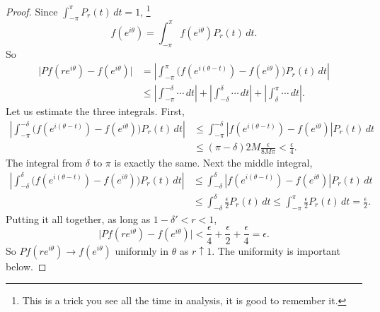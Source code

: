 \documentclass[12pt,openany]{book}
\newcommand{\sabs}[1]{\lvert {#1} \rvert}
\newcommand{\abs}[1]{\left\lvert {#1} \right\rvert}
\theoremstyle{plain}
\theoremstyle{remark}
\theoremstyle{definition}
\theoremstyle{exercise}
\theoremstyle{example}
\begin{document}
\begin{proof}
Since
$\int_{-\pi}^\pi P_r(t) \, dt = 1$,%
\footnote{This is a trick you see all the time in analysis, it is good to
remember it.}
\begin{equation*}
f(e^{i\theta})=
\int_{-\pi}^\pi f(e^{i\theta}) P_r(t) \, dt .
\end{equation*}
So
\begin{equation*}
\begin{split}
\sabs{
Pf(r e^{i\theta} ) - f(e^{i\theta})
}
& =
\abs{
\int_{-\pi}^{\pi} \bigl( f(e^{i(\theta-t)})-f(e^{i\theta}) \bigr) P_r(t) \, dt
}
\\
& \leq 
\abs{
\int_{-\pi}^{-\delta} \cdots \, dt
}
+
\abs{
\int_{-\delta}^{\delta} \cdots \, dt
}
+
\abs{
\int_{\delta}^\pi \cdots \, dt
} .
\end{split}
\end{equation*}
Let us estimate the three integrals.
First,
\begin{equation*}
\begin{split}
\abs{
\int_{-\pi}^{-\delta} \bigl( f(e^{i(\theta-t)})-f(e^{i\theta}) \bigr) P_r(t) \, dt
}
& \leq
\int_{-\pi}^{-\delta} \abs{ f(e^{i(\theta-t)})-f(e^{i\theta}) }
P_r(t) \, dt
\\
& \leq (\pi-\delta) 2M \frac{\epsilon}{8M\pi} < \frac{\epsilon}{4} .
\end{split}
\end{equation*}
The integral from $\delta$ to $\pi$ is exactly the same.
Next the middle integral,
\begin{equation*}
\begin{split}
\abs{
\int_{-\delta}^{\delta} \bigl( f(e^{i(\theta-t)})-f(e^{i\theta}) \bigr) P_r(t) \, dt
}
& \leq
\int_{-\delta}^{\delta} \abs{f(e^{i(\theta-t)})-f(e^{i\theta})}
P_r(t) \, dt
\\
& \leq
\int_{-\delta}^{\delta} \frac{\epsilon}{2} P_r(t) \, dt
\leq
\int_{-\pi}^{\pi} \frac{\epsilon}{2} P_r(t) \, dt
=\frac{\epsilon}{2} .
\end{split}
\end{equation*}
Putting it all together, as long as $1-\delta' < r < 1$,
\begin{equation*}
\sabs{
Pf(r e^{i\theta} ) - f(e^{i\theta})
} < \frac{\epsilon}{4} + \frac{\epsilon}{2} + \frac{\epsilon}{4} =
\epsilon.
\end{equation*}
So $Pf(re^{i\theta}) \to f(e^{i\theta})$ uniformly in $\theta$
as $r \uparrow 1$.
The uniformity is important below.


\end{proof}
\end{document}
